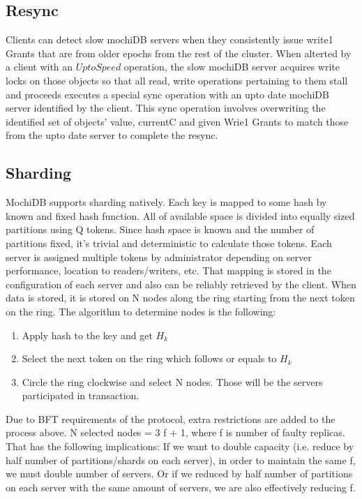 \documentclass[letterpaper,twocolumn,10pt]{article}
\begin{document}
\subsection{Resync}
Clients can detect slow mochiDB servers when they consistently issue write1 Grants that are from older epochs from the rest of the cluster. When alterted by a client with an $UptoSpeed$ operation, the slow mochiDB server acquires write locks on those objects so that all read, write operations pertaining to them stall and proceeds executes a special sync operation with an upto date mochiDB server identified by the client. This sync operation involves overwriting the identified set of objects' value, currentC and given Wrie1 Grants to match those from the upto date server to complete the resync.

\subsection{Sharding}
MochiDB supports sharding natively. Each key is mapped to some hash by known and fixed hash function. All of available space is divided into equally sized partitions using Q tokens. Since hash space is known and the number of partitions fixed, it’s trivial and deterministic to calculate those tokens.
Each server is assigned multiple tokens by administrator depending on server performance, location to readers/writers, etc. That mapping is stored in the configuration of each server and also can be reliably retrieved by the client. When data is stored, it is stored on N nodes along the ring starting from the next token on the ring. The algorithm to determine nodes is the following:
\begin{enumerate}[noitemsep, topsep=0pt,]
  \item Apply hash to the key and get $H_{k}$
  \item Select the next token on the ring which follows or equals to $H_{k}$
  \item Circle the ring clockwise and select N nodes. Those will be the servers participated in transaction.
\end{enumerate}

Due to BFT requirements of the protocol, extra restrictions are added to the process above. N selected nodes = 3 f + 1, where f is number of faulty replicas. That has the following implications: If we want to double capacity (i.e. reduce by half number of partitions/shards on each server), in order to maintain the same f, we must double number of servers. Or if we reduced by half number of partitions on each server with the same amount of servers, we are also effectively reducing f.
\end{document}
